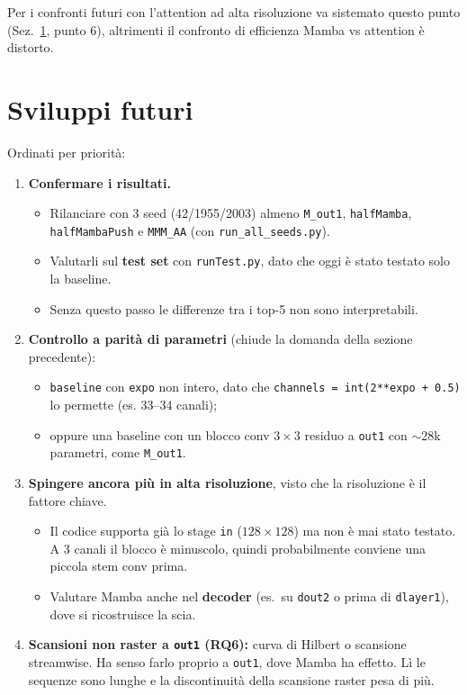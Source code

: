 \documentclass[11pt,a4paper]{article}
\newcommand{\cfg}[1]{\texttt{#1}}
\begin{document}
Per i confronti futuri con l'attention ad alta risoluzione va sistemato questo punto (Sez.~\ref{sec:futuri}, punto 6), altrimenti il confronto di efficienza Mamba vs attention è distorto.

\section{Sviluppi futuri}
\label{sec:futuri}

Ordinati per priorità:

\begin{enumerate}
  \item \textbf{Confermare i risultati.}
  \begin{itemize}
    \item Rilanciare con 3 seed (42/1955/2003) almeno \cfg{M\_out1}, \cfg{halfMamba}, \cfg{halfMambaPush} e \cfg{MMM\_AA} (con \cfg{run\_all\_seeds.py}).
    \item Valutarli sul \textbf{test set} con \cfg{runTest.py}, dato che oggi è stato testato solo la baseline.
    \item Senza questo passo le differenze tra i top-5 non sono interpretabili.
  \end{itemize}
  \item \textbf{Controllo a parità di parametri} (chiude la domanda della sezione precedente):
  \begin{itemize}
    \item \cfg{baseline} con \cfg{expo} non intero, dato che \cfg{channels = int(2**expo + 0.5)} lo permette (es. 33--34 canali);
    \item oppure una baseline con un blocco conv $3\times3$ residuo a \cfg{out1} con $\sim$28k parametri, come \cfg{M\_out1}.
  \end{itemize}
  \item \textbf{Spingere ancora più in alta risoluzione}, visto che la risoluzione è il fattore chiave.
  \begin{itemize}
    \item Il codice supporta già lo stage \cfg{in} ($128\times128$) ma non è mai stato testato. A 3 canali il blocco è minuscolo, quindi probabilmente conviene una piccola stem conv prima.
    \item Valutare Mamba anche nel \textbf{decoder} (es.\ su \cfg{dout2} o prima di \cfg{dlayer1}), dove si ricostruisce la scia.
  \end{itemize}
  \item \textbf{Scansioni non raster a \cfg{out1} (RQ6):} curva di Hilbert o scansione streamwise. Ha senso farlo proprio a \cfg{out1}, dove Mamba ha effetto. Lì le sequenze sono lunghe e la discontinuità della scansione raster pesa di più.

\end{enumerate}
\end{document}
